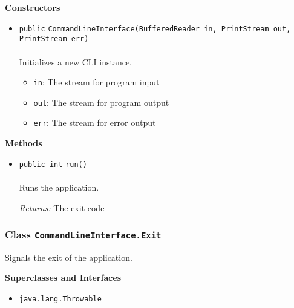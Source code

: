 \textbf{\sffamily Constructors}
\begin{itemize}
\item \lstinline|public| \lstinline|CommandLineInterface|\lstinline|(BufferedReader in, PrintStream out, PrintStream err)|\\ \\[-0.6em]
Initializes a new CLI instance.
\begin{itemize}
\item \lstinline|in|: The stream for program input
\item \lstinline|out|: The stream for program output
\item \lstinline|err|: The stream for error output
\end{itemize}



\end{itemize}


\textbf{\sffamily Methods}
\begin{itemize}
\item \lstinline|public int| \lstinline|run|\lstinline|()|\\ \\[-0.6em]
Runs the application.

\emph{Returns:} The exit code

\end{itemize}

\subsubsection{Class \lstinline|CommandLineInterface.Exit|}
Signals the exit of the application. \\
\noindent\begin{minipage}[t]{5cm}
\vspace{0.3em}
\hspace*{2em}
\vspace{0.3em}
\end{minipage}



\textbf{\sffamily Superclasses and Interfaces}
\begin{itemize}
\item \lstinline|java.lang.Throwable|
\end{itemize}


